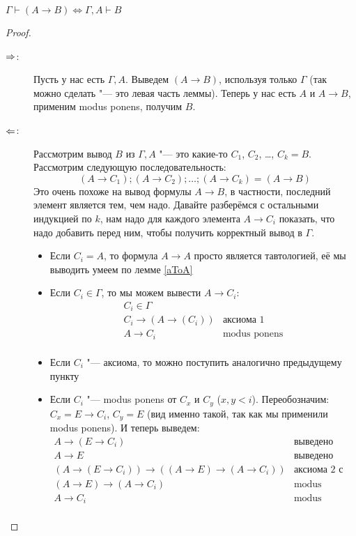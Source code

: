\begin{lemma}[о дедукции]
	$\Gamma \vdash (A \to B) \iff \Gamma, A \vdash B$
\end{lemma}
\begin{proof}
	\begin{description}
		\item[$\Rightarrow$:]
			Пусть у нас есть $\Gamma, A$.
			Выведем $(A \to B)$, используя только $\Gamma$ (так можно сделать "--- это левая часть леммы).
			Теперь у нас есть $A$ и $A \to B$, применим modus ponens, получим $B$.
		\item[$\Leftarrow$:]
			Рассмотрим вывод $B$ из $\Gamma, A$ "--- это какие-то $C_1$, $C_2$, \dots, $C_k=B$.
			Рассмотрим следующую последовательность:
			\[ (A \to C_1); (A \to C_2); \dots; (A \to C_k) = (A \to B) \]
			Это очень похоже на вывод формулы $A \to B$, в частности, последний элемент является тем, чем надо.
			Давайте разберёмся с остальными индукцией по $k$, нам надо для каждого элемента $A \to C_i$ показать, что надо добавить
			перед ним, чтобы получить корректный вывод в $\Gamma$.
			\begin{itemize}
				\item Если $C_i = A$, то формула $A \to A$ просто является тавтологией, её мы выводить умеем по лемме \ref{aToA}
				\item Если $C_i \in \Gamma$, то мы можем вывести $A \to C_i$:
					\[
					\begin{array}{cc}
						C_i \in \Gamma  & \\
						C_i \to (A \to (C_i)) & \text{аксиома 1} \\
						A \to C_i & \text{modus ponens} \\
					\end{array}
					\]
				\item Если $C_i$ "--- аксиома, то можно поступить аналогично предыдущему пункту
				\item
					Если $C_i$ "--- modus ponens от $C_x$ и $C_y$ ($x, y < i$).
					Переобозначим: $C_x = E \to C_i$, $C_y = E$ (вид именно такой, так как мы применили modus ponens).
					И теперь выведем:
					\[
					\begin{array}{cc}
						A \to (E \to C_i) & \text{выведено раньше} \\
						A \to E & \text{выведено раньше} \\
						(A \to (E \to C_i)) \to ((A \to E) \to (A \to C_i)) & \text{аксиома 2 с подстановкой} \\
						(A \to E) \to (A \to C_i) & \text{modus ponens} \\
						A \to C_i & \text{modus ponens} \\
					\end{array}
					\]
			\end{itemize}
	\end{description}
\end{proof}

